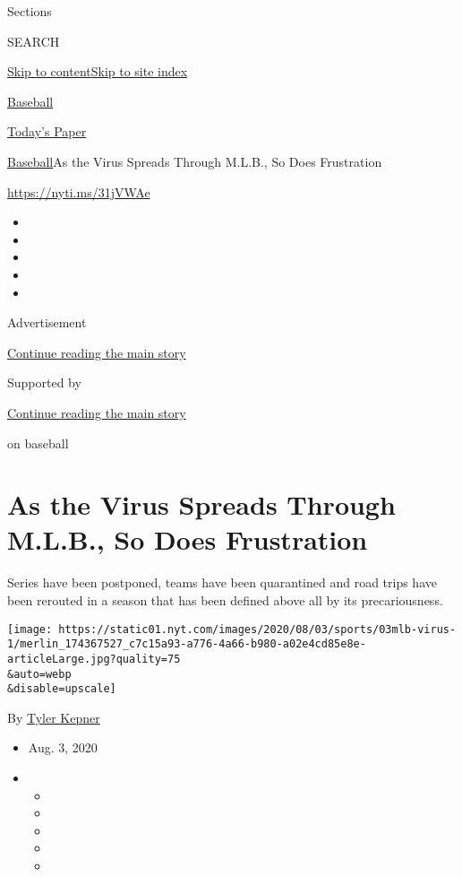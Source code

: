 Sections

SEARCH

\protect\hyperlink{site-content}{Skip to
content}\protect\hyperlink{site-index}{Skip to site index}

\href{https://www.nytimes.com/section/sports/baseball}{Baseball}

\href{https://myaccount.nytimes.com/auth/login?response_type=cookie\&client_id=vi}{}

\href{https://www.nytimes.com/section/todayspaper}{Today's Paper}

\href{/section/sports/baseball}{Baseball}\textbar{}As the Virus Spreads
Through M.L.B., So Does Frustration

\url{https://nyti.ms/31jVWAe}

\begin{itemize}
\item
\item
\item
\item
\item
\end{itemize}

Advertisement

\protect\hyperlink{after-top}{Continue reading the main story}

Supported by

\protect\hyperlink{after-sponsor}{Continue reading the main story}

on baseball

\hypertarget{as-the-virus-spreads-through-mlb-so-does-frustration}{%
\section{As the Virus Spreads Through M.L.B., So Does
Frustration}\label{as-the-virus-spreads-through-mlb-so-does-frustration}}

Series have been postponed, teams have been quarantined and road trips
have been rerouted in a season that has been defined above all by its
precariousness.

\texttt{[image: https://static01.nyt.com/images/2020/08/03/sports/03mlb-virus-1/merlin\_174367527\_c7c15a93-a776-4a66-b980-a02e4cd85e8e-articleLarge.jpg?quality=75\\\&auto=webp\\\&disable=upscale]}

By \href{https://www.nytimes.com/by/tyler-kepner}{Tyler Kepner}

\begin{itemize}
\item
  Aug. 3, 2020
\item
  \begin{itemize}
  \item
  \item
  \item
  \item
  \item
  \end{itemize}
\end{itemize}

